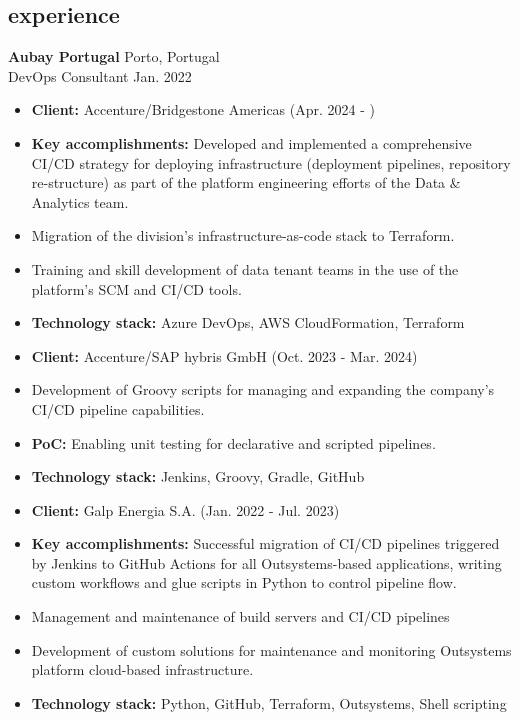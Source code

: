 \documentclass[12pt]{article}
\newcommand{\entry}[4]{{{\textbf{#1}}} \hfill #3 \\ #2 \hfill #4}
\begin{document}
\begin{paracol}{2}
\switchcolumn*

\section{experience}

\entry{Aubay Portugal}{DevOps Consultant}{Porto, Portugal}{Jan. 2022}
\begin{itemize}[noitemsep,leftmargin=3.5mm,rightmargin=0mm,topsep=6pt]
  \item \textbf{Client:} Accenture/Bridgestone Americas (Apr. 2024 - )
  \item \textbf{Key accomplishments:} Developed and implemented a comprehensive CI/CD strategy for deploying infrastructure (deployment pipelines, repository re-structure) as part of the platform engineering efforts of the Data & Analytics team.
  \item Migration of the division's infrastructure-as-code stack to Terraform.
  \item Training and skill development of data tenant teams in the use of the platform's SCM and CI/CD tools.
  \item \textbf{Technology stack:} Azure DevOps, AWS CloudFormation, Terraform
  \medskip
  \item \textbf{Client:} Accenture/SAP hybris GmbH (Oct. 2023 - Mar. 2024)
  \item Development of Groovy scripts for managing and expanding the company's CI/CD pipeline capabilities.
  \item \textbf{PoC:} Enabling unit testing for declarative and scripted pipelines.
  \item \textbf{Technology stack:} Jenkins, Groovy, Gradle, GitHub
  \medskip
  \item \textbf{Client:} Galp Energia S.A. (Jan. 2022 - Jul. 2023)
  \item \textbf{Key accomplishments:} Successful migration of CI/CD pipelines triggered by Jenkins to GitHub Actions for all Outsystems-based applications, writing custom workflows and glue scripts in Python to control pipeline flow.
  \item Management and maintenance of build servers and CI/CD pipelines
  \item Development of custom solutions for maintenance and monitoring Outsystems platform cloud-based
  infrastructure.
  \item \textbf{Technology stack:} Python, GitHub, Terraform, Outsystems, Shell scripting
\end{itemize}


\end{paracol}
\end{document}
